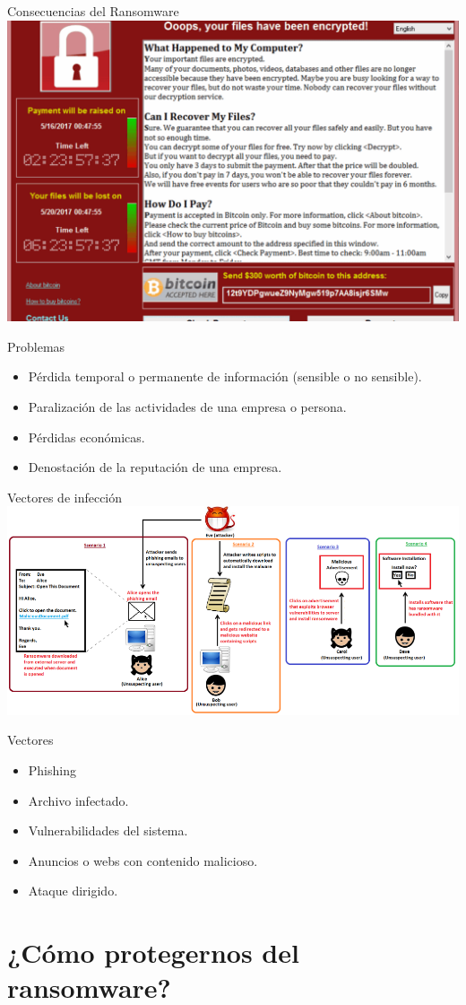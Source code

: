 \documentclass[10pt]{beamer}
\begin{document}
\begin{frame}[fragile]{Consecuencias del Ransomware}
	\centering
	\includegraphics[scale=0.16]{./Imagenes/ransomware3.png}
	\pause
	\begin{block}{Problemas}
		\begin{itemize}
			\item Pérdida temporal o permanente de información (sensible o no sensible).
			\pause
			\item Paralización de las actividades de una empresa o persona.
			\pause
			\item Pérdidas económicas.
			\pause
			\item Denostación de la reputación de una empresa.
		\end{itemize}
	\end{block}
\end{frame}

\begin{frame}[fragile]{Vectores de infección}
	\centering
	\includegraphics[scale=0.36]{./Imagenes/ransomware4.png}
	\pause
	\begin{block}{Vectores}
		\begin{itemize}
			\item Phishing
			\pause
			\item Archivo infectado.
			\pause
			\item Vulnerabilidades del sistema.
			\pause
			\item Anuncios o webs con contenido malicioso.
			\pause
			\item Ataque dirigido.
		\end{itemize}
	\end{block}
\end{frame}

\section{¿Cómo protegernos del ransomware?}
\end{document}
